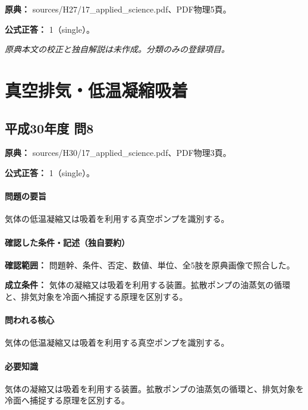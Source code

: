 \noindent\textbf{原典：} sources/H27/17\_applied\_science.pdf、PDF物理5頁。

\textbf{公式正答：} 1（single）。

\par\textit{原典本文の校正と独自解説は未作成。分類のみの登録項目。}

\section{真空排気・低温凝縮吸着}

\subsection{平成30年度 問8}
\label{q:h30-reg-applied-08}

\noindent\textbf{原典：} sources/H30/17\_applied\_science.pdf、PDF物理3頁。

\textbf{公式正答：} 1（single）。

\paragraph{問題の要旨} 気体の低温凝縮又は吸着を利用する真空ポンプを識別する。

\paragraph{確認した条件・記述（独自要約）}\mbox{}\par

\noindent\textbf{確認範囲：} 問題幹、条件、否定、数値、単位、全5肢を原典画像で照合した。\par

\noindent\textbf{成立条件：} 気体の凝縮又は吸着を利用する装置。拡散ポンプの油蒸気の循環と、排気対象を冷面へ捕捉する原理を区別する。\par

\paragraph{問われる核心} 気体の低温凝縮又は吸着を利用する真空ポンプを識別する。

\paragraph{必要知識} 気体の凝縮又は吸着を利用する装置。拡散ポンプの油蒸気の循環と、排気対象を冷面へ捕捉する原理を区別する。

